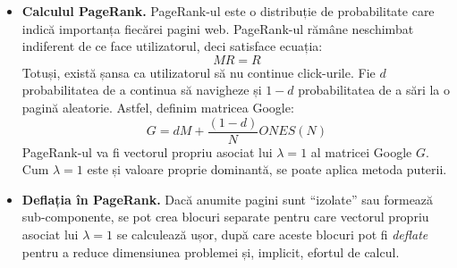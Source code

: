 \documentclass{exam}
\begin{document}
\begin{itemize}
	\item \textbf{Calculul PageRank.} PageRank-ul este o distribuție de
	      probabilitate care indică importanța fiecărei pagini web. PageRank-ul
	      rămâne neschimbat indiferent de ce face utilizatorul, deci satisface
	      ecuația:
	      \begin{equation*}
		      M R = R
	      \end{equation*}
	      Totuși, există șansa ca utilizatorul să nu continue click-urile. Fie
	      $d$ probabilitatea de a continua să navigheze și $1-d$ probabilitatea
	      de a sări la o pagină aleatorie. Astfel, definim matricea Google:
	      \begin{equation*}
		      G = d M + \frac{(1-d)}{N} ONES(N)
	      \end{equation*}
	      PageRank-ul va fi vectorul propriu asociat lui $\lambda=1$ al matricei
	      Google $G$. Cum $\lambda=1$ este și valoare proprie dominantă, se
	      poate aplica metoda puterii.

	\item \textbf{Deflația în PageRank.} Dacă anumite pagini sunt “izolate” sau
	      formează sub-componente, se pot crea blocuri separate pentru care vectorul
	      propriu asociat lui $\lambda=1$ se calculează ușor, după care aceste blocuri
	      pot fi \textit{deflate} pentru a reduce dimensiunea problemei și, implicit,
	      efortul de calcul.
\end{itemize}




\end{document}
